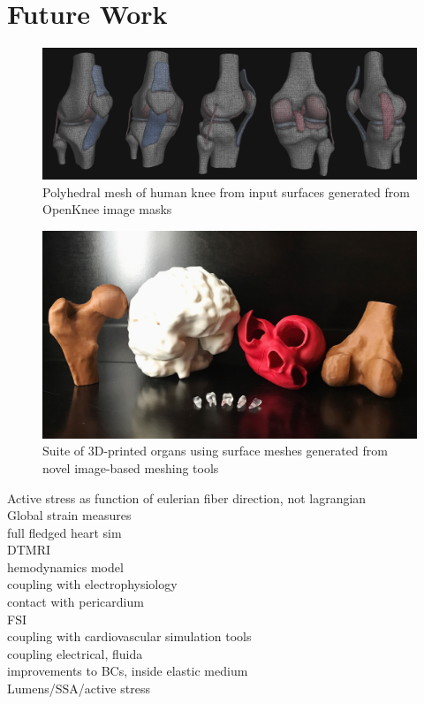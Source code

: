 \chapter{Future Work}

\begin{figure}[ht]
\centering
		\includegraphics[width=1.0\textwidth]{media/7-polyknee/fullmesh.png}
%
\caption{Polyhedral mesh of human knee from input surfaces generated from OpenKnee image masks}
\label{fig:polyknee}
\end{figure}

\begin{figure}[ht]
\centering
		\includegraphics[width=1.0\textwidth]{media/6-3dprint/3dprint.jpg}
%
\caption{Suite of 3D-printed organs using surface meshes generated from novel image-based meshing tools}
\label{fig:3dprint}
\end{figure}


Active stress as function of eulerian fiber direction, not lagrangian \\
Global strain measures \\
full fledged heart sim \\
DTMRI \\
hemodynamics model \\
coupling with electrophysiology \\
contact with pericardium \\
FSI \\
coupling with cardiovascular simulation tools \\
coupling electrical, fluida \\
improvements to BCs, inside elastic medium \\
Lumens/SSA/active stress \\

